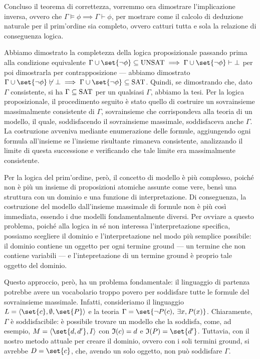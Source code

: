 Concluso il teorema di correttezza, vorremmo ora dimostrare l'implicazione inversa, ovvero che \(\Gamma \models \phi \implies \Gamma \vdash \phi\), per mostrare come il calcolo di deduzione naturale per il prim'ordine sia completo, ovvero catturi tutta e sola la relazione di conseguenza logica.

Abbiamo dimostrato la completezza della logica proposizionale passando prima alla condizione equivalente \(\Gamma \cup \set{\neg \phi} \subseteq \Unsat \implies \Gamma \cup \set{\neg \phi} \vdash \bot\) per poi dimostrarla per contrapposizione --- abbiamo dimostrato \(\Gamma \cup \set{\neg \phi}\not\vdash \bot \implies \Gamma \cup \set{\neg \phi} \subseteq \Sat\). Quindi, se dimostrando che, dato \(\Gamma\) consistente, si ha \(\Gamma \subseteq \Sat\) per un qualsiasi \(\Gamma\), abbiamo la tesi. 
Per la logica proposizionale, il procedimento seguito è stato quello di costruire un sovrainsieme massimalmente consistente di \(\Gamma\), sovrainsieme che corrispondeva alla teoria di un modello, il quale, soddisfacendo il sovrainsieme massimale, soddisfaceva anche \(\Gamma\). La costruzione avveniva mediante enumerazione delle formule, aggiungendo ogni formula all'insieme se l'insieme risultante rimaneva consistente, analizzando il limite di questa successione e verificando che tale limite era massimalmente consistente.

Per la logica del prim'ordine, però, il concetto di modello è più complesso, poiché non è più un insieme di proposizioni atomiche assunte come vere, bensì una struttura con un dominio e una funzione di interpretazione. Di conseguenza, la costruzione del modello dall'insieme massimale di formule non è più così immediata, essendo i due modelli fondamentalmente diversi. Per ovviare a questo problema, poiché alla logica in sé non interessa l'interpretazione specifica, possiamo scegliere il dominio e l'interpretazione nel modo più semplice possibile: il dominio contiene un oggetto per ogni termine ground --- un termine che non contiene variabili --- e l'intepretazione di un termine ground è proprio tale oggetto del dominio.

Questo approccio, però, ha un problema fondamentale: il linguaggio di partenza potrebbe avere un vocabolario troppo povero per soddisfare tutte le formule del sovrainsieme massimale. Infatti, consideriamo il linguaggio \(L=\langle \set{c}, \emptyset, \set{P}\rangle\) e la teoria \(\Gamma = \set{\neg P(c),\: \exists x, P(x)}\). Chiaramente, \(\Gamma\) è soddisfacibile: è possibile trovare un modello che la soddisfa, come, ad esempio, \(M = \langle \set{d,d'}, I\rangle\) con \(\mathfrak{I}(c) = d\) e \(\Interp(P) = \set{d'}\). Tuttavia, con il nostro metodo attuale per creare il dominio, ovvero con i soli termini ground, si avrebbe \(D=\set{c}\), che, avendo un solo oggetto, non può soddisfare \(\Gamma\). 

